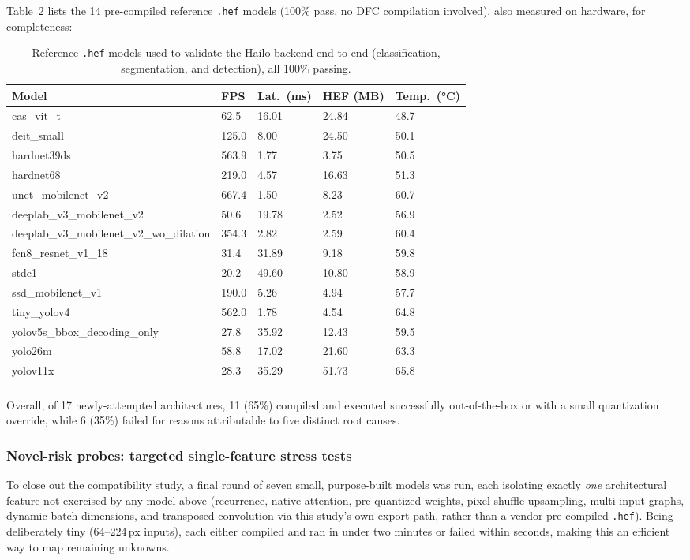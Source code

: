 \documentclass[11pt]{article}
\begin{document}
Table~2 lists the 14 pre-compiled reference \texttt{.hef} models (100\% pass,
no DFC compilation involved), also measured on hardware, for completeness:

\begin{longtable}{@{}p{4cm}p{1.4cm}p{1.3cm}p{1.6cm}p{1.9cm}@{}}
\toprule
\textbf{Model} & \textbf{FPS} & \textbf{Lat.\ (ms)} & \textbf{HEF (MB)} & \textbf{Temp.\ (°C)} \\
\midrule
\endhead
cas\_vit\_t & 62.5 & 16.01 & 24.84 & 48.7 \\
deit\_small & 125.0 & 8.00 & 24.50 & 50.1 \\
hardnet39ds & 563.9 & 1.77 & 3.75 & 50.5 \\
hardnet68 & 219.0 & 4.57 & 16.63 & 51.3 \\
unet\_mobilenet\_v2 & 667.4 & 1.50 & 8.23 & 60.7 \\
deeplab\_v3\_mobilenet\_v2 & 50.6 & 19.78 & 2.52 & 56.9 \\
deeplab\_v3\_mobilenet\_v2\_wo\_dilation & 354.3 & 2.82 & 2.59 & 60.4 \\
fcn8\_resnet\_v1\_18 & 31.4 & 31.89 & 9.18 & 59.8 \\
stdc1 & 20.2 & 49.60 & 10.80 & 58.9 \\
ssd\_mobilenet\_v1 & 190.0 & 5.26 & 4.94 & 57.7 \\
tiny\_yolov4 & 562.0 & 1.78 & 4.54 & 64.8 \\
yolov5s\_bbox\_decoding\_only & 27.8 & 35.92 & 12.43 & 59.5 \\
yolo26m & 58.8 & 17.02 & 21.60 & 63.3 \\
yolov11x & 28.3 & 35.29 & 51.73 & 65.8 \\
\bottomrule
\caption{Reference \texttt{.hef} models used to validate the Hailo backend
end-to-end (classification, segmentation, and detection), all 100\% passing.}
\end{longtable}

Overall, of 17 newly-attempted architectures, 11 (65\%) compiled and executed
successfully out-of-the-box or with a small quantization override, while 6
(35\%) failed for reasons attributable to five distinct root causes.

\subsubsection{Novel-risk probes: targeted single-feature stress tests}

To close out the compatibility study, a final round of seven small,
purpose-built models was run, each isolating exactly \emph{one} architectural
feature not exercised by any model above (recurrence, native attention,
pre-quantized weights, pixel-shuffle upsampling, multi-input graphs, dynamic
batch dimensions, and transposed convolution via this study's own export
path, rather than a vendor pre-compiled \texttt{.hef}). Being deliberately
tiny (64--224\,px inputs), each either compiled and ran in under two minutes
or failed within seconds, making this an efficient way to map remaining
unknowns.
\end{document}

